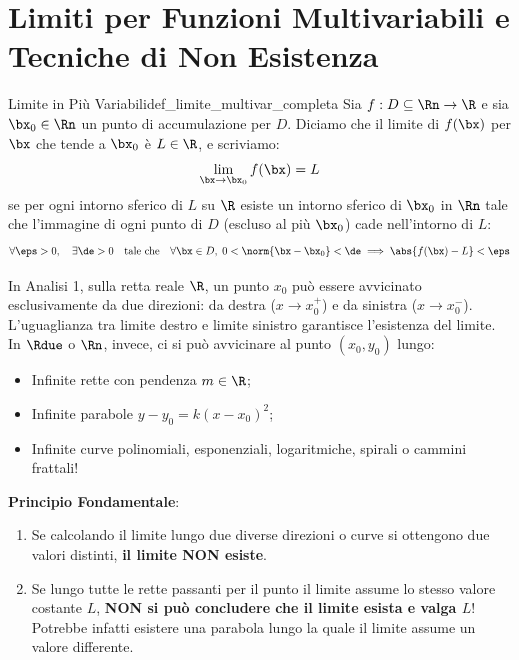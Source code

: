 \section{Limiti per Funzioni Multivariabili e Tecniche di Non Esistenza}

\begin{definizione}{Limite in Più Variabili}{def_limite_multivar_completa}
Sia $f: D \subseteq \Rn \to \R$ e sia $\bx_0 \in \Rn$ un punto di accumulazione per $D$. Diciamo che il limite di $f(\bx)$ per $\bx$ che tende a $\bx_0$ è $L \in \R$, e scriviamo:
\[
\lim_{\bx \to \bx_0} f(\bx) = L
\]
se per ogni intorno sferico di $L$ su $\R$ esiste un intorno sferico di $\bx_0$ in $\Rn$ tale che l'immagine di ogni punto di $D$ (escluso al più $\bx_0$) cade nell'intorno di $L$:
\[
\forall \eps > 0, \quad \exists \de > 0 \quad \text{tale che} \quad \forall \bx \in D, \; 0 < \norm{\bx - \bx_0} < \de \implies \abs{f(\bx) - L} < \eps
\]
\end{definizione}

\begin{esame}
In Analisi 1, sulla retta reale $\R$, un punto $x_0$ può essere avvicinato esclusivamente da due direzioni: da destra ($x \to x_0^+$) e da sinistra ($x \to x_0^-$). L'uguaglianza tra limite destro e limite sinistro garantisce l'esistenza del limite.\\
In $\Rdue$ o $\Rn$, invece, ci si può avvicinare al punto $(x_0, y_0)$ lungo:
\begin{itemize}
    \item Infinite rette con pendenza $m \in \R$;
    \item Infinite parabole $y - y_0 = k (x - x_0)^2$;
    \item Infinite curve polinomiali, esponenziali, logaritmiche, spirali o cammini frattali!
\end{itemize}
\textbf{Principio Fondamentale}:
\begin{enumerate}
    \item Se calcolando il limite lungo due diverse direzioni o curve si ottengono due valori distinti, \textbf{il limite NON esiste}.
    \item Se lungo tutte le rette passanti per il punto il limite assume lo stesso valore costante $L$, \textbf{NON si può concludere che il limite esista e valga $L$}! Potrebbe infatti esistere una parabola lungo la quale il limite assume un valore differente.
\end{enumerate}
\end{esame}


